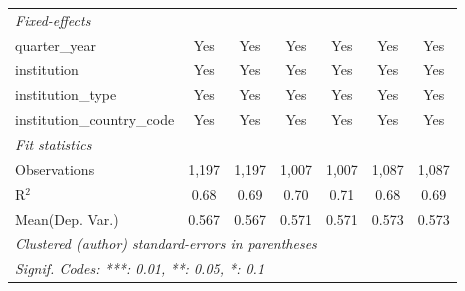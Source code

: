 \begin{tabular}{lcccccc}
   \midrule
   \emph{Fixed-effects}\\
   quarter\_year                      & Yes     & Yes          & Yes     & Yes          & Yes     & Yes\\  
   institution                        & Yes     & Yes          & Yes     & Yes          & Yes     & Yes\\  
   institution\_type                  & Yes     & Yes          & Yes     & Yes          & Yes     & Yes\\  
   institution\_country\_code         & Yes     & Yes          & Yes     & Yes          & Yes     & Yes\\  
   \midrule
   \emph{Fit statistics}\\
   Observations                       & 1,197   & 1,197        & 1,007   & 1,007        & 1,087   & 1,087\\  
   R$^2$                              & 0.68    & 0.69         & 0.70    & 0.71         & 0.68    & 0.69\\  
Mean(Dep. Var.) & 0.567 & 0.567 & 0.571 & 0.571 & 0.573 & 0.573 \\
   \midrule \midrule
   \multicolumn{7}{l}{\emph{Clustered (author) standard-errors in parentheses}}\\
   \multicolumn{7}{l}{\emph{Signif. Codes: ***: 0.01, **: 0.05, *: 0.1}}\\
\end{tabular}
\par\endgroup
